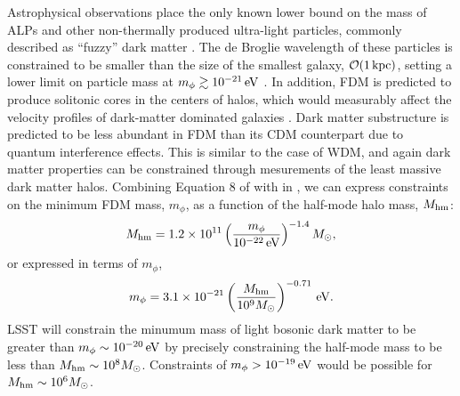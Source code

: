 Astrophysical observations place the only known lower bound on the mass of ALPs and other non-thermally produced ultra-light particles, commonly described as ``fuzzy'' dark matter \citep[FDM; \eg,][]{Hu:2000,Hui:2017}. 
The de Broglie wavelength of these particles is constrained to be smaller than the size of the smallest galaxy, $\mathcal{O}(1\mathrm{\,kpc})$, setting a lower limit on particle mass at $m_\phi \gtrsim 10^{-21}\mathrm{\,eV}$ \citep{1703.04683}. 
In addition, FDM is predicted to produce solitonic cores in the centers of halos, which would measurably affect the velocity profiles of dark-matter dominated galaxies \citep{Robles:2012uy,Robles:2018fur,Schive:2014hza,Du:2016aik}. 
Dark matter substructure is predicted to be less abundant in FDM than its CDM counterpart due to quantum interference effects.
This is similar to the case of WDM, and again dark matter properties can be constrained through mesurements of the least massive dark matter halos.
Combining Equation 8 of \citet[][]{1703.09126} with  in , we can express constraints on the minimum FDM mass, $m_\phi$, as a function of the half-mode halo mass, $M_{\rm hm}$:
\begin{equation}
M_{\rm hm} = 1.2 \times 10^{11} \left( \frac{m_\phi}{10^{-22}\mathrm{\,eV}} \right)^{-1.4} M_\odot,
\end{equation}
or expressed in terms of $m_\phi$, 
\begin{equation}
m_\phi = 3.1 \times 10^{-21} \left( \frac{M_{\rm hm}}{10^{9}M_\odot} \right)^{-0.71} \mathrm{\,eV}.
\end{equation}
LSST will constrain the minumum mass of light bosonic dark matter to be greater than $m_\phi \sim 10^{-20} \mathrm{\,eV}$ by precisely constraining the half-mode mass to be less than $M_{\rm hm} \sim 10^{8} M_\odot$. 
Constraints of $m_\phi > 10^{-19} \mathrm{\,eV}$ would be possible for $M_{\rm hm} \sim 10^{6} M_\odot$.




